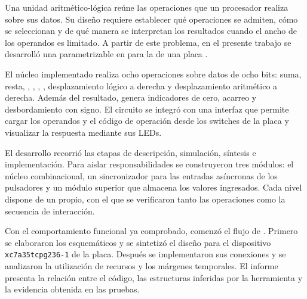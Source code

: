 Una unidad aritmético-lógica reúne las operaciones que un procesador realiza sobre sus datos. Su diseño requiere establecer qué operaciones se admiten, cómo se seleccionan y de qué manera se interpretan los resultados cuando el ancho de los operandos es limitado. A partir de este problema, en el presente trabajo se desarrolló una  parametrizable en  para la  de una placa .

El núcleo implementado realiza ocho operaciones sobre datos de ocho bits: suma, resta, , , , , desplazamiento lógico a derecha y desplazamiento aritmético a derecha. Además del resultado, genera indicadores de cero, acarreo y desbordamiento con signo. El circuito se integró con una interfaz que permite cargar los operandos y el código de operación desde los switches de la placa y visualizar la respuesta mediante sus LEDs.

El desarrollo recorrió las etapas de descripción, simulación, síntesis e implementación. Para aislar responsabilidades se construyeron tres módulos: el núcleo combinacional, un sincronizador para las entradas asíncronas de los pulsadores y un módulo superior que almacena los valores ingresados. Cada nivel dispone de un  propio, con el que se verificaron tanto las operaciones como la secuencia de interacción.

Con el comportamiento funcional ya comprobado, comenzó el flujo de
. Primero se elaboraron los esquemáticos y se sintetizó el
diseño para el dispositivo \texttt{xc7a35tcpg236-1} de la placa. %
Después se implementaron sus conexiones y se analizaron la utilización
de recursos y los márgenes temporales. El informe presenta la relación
entre el código, las estructuras inferidas por la herramienta y la
evidencia obtenida en las pruebas.
